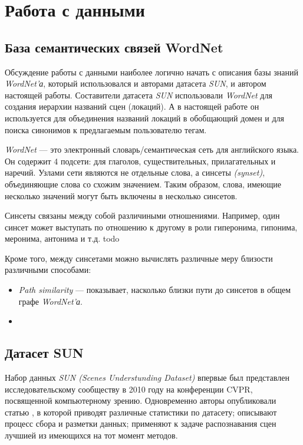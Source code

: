 \section{Работа с данными}


\subsection{База семантических связей WordNet}

\indent
\indent
Обсуждение работы с данными наиболее логично начать с описания базы знаний
\textit{WordNet'а}, который использовался и авторами датасета \textit{SUN},
и автором настоящей работы. Составители датасета \textit{SUN} использовали
\textit{WordNet} для создания иерархии названий сцен (локаций). А в настоящей работе
он используется для объединения названий локаций в обобщающий домен
и для поиска синонимов к предлагаемым пользователю тегам.

\indent
\textit{WordNet} --- это электронный словарь/семантическая сеть для английского
языка. Он содержит 4 подсети: для глаголов, существительных, прилагательных и
наречий. Узлами сети являются не отдельные слова, а синсеты \textit{(synset)},
объединяющие слова со схожим значением. Таким образом, слова, имеющие 
несколько значений могут быть включены в несколько синсетов.

Синсеты связаны между собой различиными отношениями. 
Например, один синсет может выступать по отношению к другому в роли гиперонима, гипонима, меронима, антонима и т.д. todo 

Кроме того, между синсетами можно вычислять различные меру близости
различными способами:

\begin{itemize}

    \item \textit{Path similarity} --- показывает, насколько близки пути до 
    синсетов в общем графе \textit{WordNet'а}.
    
    \item
    
    
\end{itemize}


\subsection{Датасет SUN}

\indent
\indent
Набор данных \textit{SUN (Scenes Understunding Dataset)} впервые был 
представлен исследовательскому сообществу в 2010 году на 
конференции CVPR, посвященной компьютерному зрению. Одновременно
авторы опубликовали статью \cite{sundata}, в которой приводят различные
статистики по датасету; описывают процесс сбора и разметки данных; 
применяют к задаче распознавания сцен лучшией из имеющихся
на тот момент методов. 

